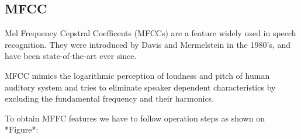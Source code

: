 
\subsection{MFCC}

Mel Frequency Cepstral Coefficents (MFCCs) are a feature widely used in speech recognition.
They were introduced by Davis and Mermelstein in the 1980's, and have been state-of-the-art ever since.

MFCC mimics the logarithmic perception of loudness and pitch of human auditory system and tries to eliminate speaker dependent characteristics by excluding the fundamental frequency and their harmonics.


To obtain MFFC features we have to follow operation steps as shown on *Figure*:

